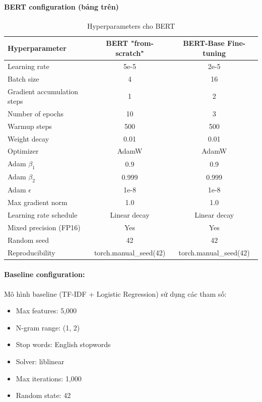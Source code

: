 \paragraph{BERT configuration (bảng trên)}
\begin{table}[H]
\centering
\caption{Hyperparameters cho BERT}
\label{tab:hyperparameters}
\begin{tabular}{lcc}
\toprule
\textbf{Hyperparameter} & \textbf{BERT "from-scratch"} & \textbf{BERT-Base Fine-tuning} \\
\midrule
Learning rate & 5e-5 & 2e-5 \\
Batch size & 4 & 16 \\
Gradient accumulation steps & 1 & 2 \\
Number of epochs & 10 & 3 \\
Warmup steps & 500 & 500 \\
Weight decay & 0.01 & 0.01 \\
Optimizer & AdamW & AdamW \\
Adam $\beta_1$ & 0.9 & 0.9 \\
Adam $\beta_2$ & 0.999 & 0.999 \\
Adam $\epsilon$ & 1e-8 & 1e-8 \\
Max gradient norm & 1.0 & 1.0 \\
Learning rate schedule & Linear decay & Linear decay \\
Mixed precision (FP16) & Yes & Yes \\
Random seed & 42 & 42 \\
Reproducibility & torch.manual\_seed(42) & torch.manual\_seed(42)\\
\bottomrule
\end{tabular}
\end{table}

\paragraph{Baseline configuration:}
Mô hình baseline (TF-IDF + Logistic Regression) sử dụng các tham số:
\begin{itemize}
    \item Max features: 5,000
    \item N-gram range: (1, 2)
    \item Stop words: English stopwords
    \item Solver: liblinear
    \item Max iterations: 1,000
    \item Random state: 42
\end{itemize}

